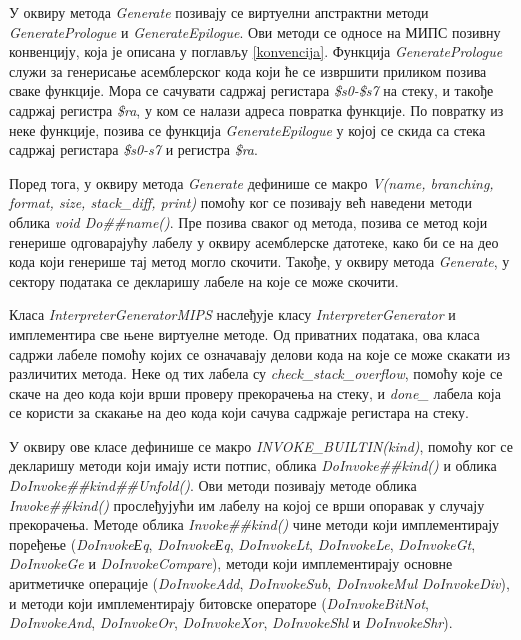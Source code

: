 \documentclass[12pt,oneside]{memoir}
\begin{document}
У оквиру метода \textit{Generate} позивају се виртуелни апстрактни методи \textit{GeneratePrologue} и \textit{GenerateEpilogue}. Ови методи се односе на МИПС позивну конвенцију, која је описана у поглављу \ref{konvencija}. Функција \textit{GeneratePrologue} служи за генерисање асемблерског кода који ће се извршити приликом позива сваке функције. Мора се сачувати садржај регистара \textit{\$s0-\$s7} на стеку, и такође садржај регистра \textit{\$ra}, у ком се налази адреса повратка функције. По повратку из неке функције, позива се функција \textit{GenerateEpilogue} у којој се скида са стека садржај регистара \textit{\$s0-s7} и регистра \textit{\$ra}.

Поред тога, у оквиру метода \textit{Generate} дефинише се макро \textit{V(name, branching, format, size, stack\_diff, print)} помоћу ког се позивају већ наведени методи облика \textit{void Do\#\#name()}. Пре позива сваког од метода, позива се метод који генерише одговарајућу лабелу у оквиру асемблерске датотеке, како би се на део кода који генерише тај метод могло скочити. Такође, у оквиру метода \textit{Generate}, у сектору података се декларишу лабеле на које се може скочити.

Класа \textit{InterpreterGeneratorMIPS} наслеђује класу \textit{InterpreterGenerator} и имплементира све њене виртуелне методе. 
Од приватних података, ова класа садржи лабеле помоћу којих се означавају делови кода на које се може скакати из различитих метода. Неке од тих лабела су \textit{check\_stack\_overflow}, помоћу које се скаче на део кода који врши проверу прекорачења на стеку, и \textit{done\_} лабела која се користи за скакање на део кода који сачува садржаје регистара на стеку.

У оквиру ове класе дефинише се макро \textit{INVOKE\_BUILTIN(kind)}, помоћу ког се декларишу методи који имају исти потпис, облика \textit{DoInvoke\#\#kind()} и облика \textit{DoInvoke\#\#kind\#\#Unfold()}. Ови методи позивају методе облика \textit{Invoke\#\#kind()} прослеђујући им лабелу на којој се врши опоравак у случају прекорачења. Методе облика \textit{Invoke\#\#kind()} чине методи који имплементирају поређење (\textit{DoInvokeЕq}, \textit{DoInvokeЕq}, \textit{DoInvokeLt}, \textit{DoInvokeLe}, \textit{DoInvokeGt}, \textit{DoInvokeGe} и \textit{DoInvokeCompare}), методи који имплементирају основне аритметичке операције (\textit{DoInvokeAdd}, \textit{DoInvokeSub}, \textit{DoInvokeMul} \textit{DoInvokeDiv}), и методи који имплементирају битовске операторе (\textit{DoInvokeBitNot}, \textit{DoInvokeAnd}, \textit{DoInvokeOr}, \textit{DoInvokeXor}, \textit{DoInvokeShl} и \textit{DoInvokeShr}). 
\end{document}
